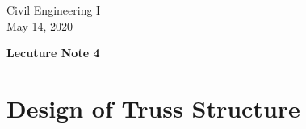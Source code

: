 \documentclass[10pt,a4j]{article}
\newlength{\minitwocolumn}
\begin{document}
\newcommand{\fat}[1]{\mbox{\boldmath $#1$}}
\newcommand{\D}{\partial}
\newcommand{\w}{\omega}
\newcommand{\ga}{\alpha}
\newcommand{\gb}{\beta}
\newcommand{\gx}{\xi}
\newcommand{\gz}{\zeta}
\newcommand{\vhat}[1]{\hat{\fat{#1}}}
\newcommand{\spc}{\vspace{0.7\baselineskip}}
\newcommand{\halfspc}{\vspace{0.3\baselineskip}}

\newcommand{\twofig}[2]
 {
   \begin{figure}
     \begin{minipage}[t]{\minitwocolumn}
         \begin{center}   #1
         \end{center}
     \end{minipage}
         \hspace{\columnsep}
     \begin{minipage}[t]{\minitwocolumn}
         \begin{center} #2
         \end{center}
     \end{minipage}
   \end{figure}
 }
\begin{flushright}
	Civil Engineering I\\
	May 14, 2020
\end{flushright}
\begin{center}
	{\LARGE \bf Lecuture Note 4 }
\end{center}
\setcounter{section}{3}
\section{Design of Truss Structure}
\end{document}
